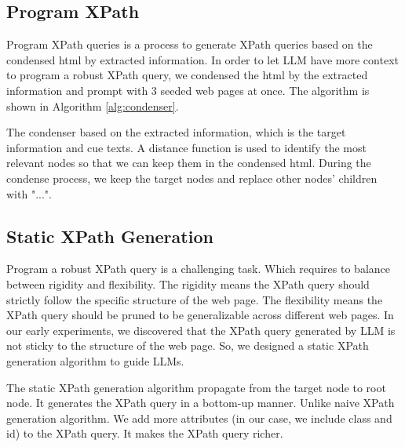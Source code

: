 \documentclass[a4paper]{article}
\begin{document}
\subsection{Program XPath}

Program XPath queries is a process to generate XPath queries based on the condensed html by extracted information. In order to let LLM have more context to program a robust XPath query, we condensed the html by the extracted information and prompt with 3 seeded web pages at once. The algorithm is shown in Algorithm \ref{alg:condenser}.

The condenser based on the extracted information, which is the target information and cue texts. A distance function is used to identify the most relevant nodes so that we can keep them in the condensed html. During the condense process, we keep the target nodes and replace other nodes' children with "...".


\subsection{Static XPath Generation}

Program a robust XPath query is a challenging task. Which requires to balance between rigidity and flexibility. The rigidity means the XPath query should strictly follow the specific structure of the web page. The flexibility means the XPath query should be pruned to be generalizable across different web pages. In our early experiments, we discovered that the XPath query generated by LLM is not sticky to the structure of the web page. So, we designed a static XPath generation algorithm to guide LLMs.

The static XPath generation algorithm propagate from the target node to root node. It generates the XPath query in a bottom-up manner. Unlike naive XPath generation algorithm. We add more attributes (in our case, we include class and id) to the XPath query. It makes the XPath query richer.
\end{document}

